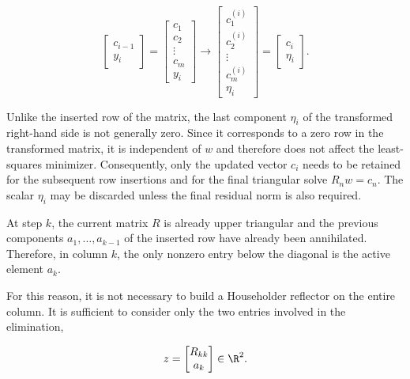 \begin{equation}
    \begin{bmatrix}
        c_{i-1} \\
        y_i
    \end{bmatrix}
    =
    \begin{bmatrix}
        c_1 \\
        c_2 \\
        \vdots \\
        c_m \\
        y_i
    \end{bmatrix}
    \longrightarrow
    \begin{bmatrix}
        c^{(i)}_1 \\
        c^{(i)}_2 \\
        \vdots \\
        c^{(i)}_m \\
        \eta_i
    \end{bmatrix}
    =
    \begin{bmatrix}
        c_i \\
        \eta_i
    \end{bmatrix}.
\end{equation}

\noindent Unlike the inserted row of the matrix, the last component $\eta_i$ of the transformed right-hand side is not generally zero. Since it corresponds to a zero row in the transformed matrix, it is independent of $w$ and therefore does not affect the least-squares minimizer. Consequently, only the updated vector $c_i$ needs to be retained for the subsequent row insertions and for the final triangular solve $R_n w = c_n$. The scalar $\eta_i$ may be discarded unless the final residual norm is also required.

\noindent At step $k$, the current matrix $R$ is already upper triangular and the
previous components $a_1,\ldots,a_{k-1}$ of the inserted row have already
been annihilated. Therefore, in column $k$, the only nonzero entry below the
diagonal is the active element $a_k$.

\noindent For this reason, it is not necessary to build a Householder reflector on the
entire column. It is sufficient to consider only the two entries involved in
the elimination,

\begin{equation}
    z =
    \begin{bmatrix}
        R_{kk} \\
        a_k
    \end{bmatrix}
    \in \R^2.
\end{equation}


